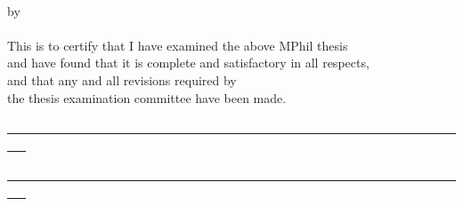 \begin{center}
{\Large \thesistitle}\\
\vspace{5mm}
by\\
\vspace{3mm}
\thesisauthor\\
\vspace{5mm}
This is to certify that I have examined the above MPhil thesis\\
and have found that it is complete and satisfactory in all respects,\\
and that any and all revisions required by\\
the thesis examination committee have been made.
\end{center}

\vspace{15mm}

\begin{center}
\underline{~~~~~~~~~~~~~~~~~~~~~~~~~~~~~~~~~~~~~~~~~~~~~~~~~~~~~~~~~~~~~~~~~~~~~~~~~~~ }\\
\supervisorinfo
\end{center}


\vspace{15mm}
\begin{center}
\underline{~~~~~~~~~~~~~~~~~~~~~~~~~~~~~~~~~~~~~~~~~~~~~~~~~~~~~~~~~~~~~~~~~~~~~~~~~~~ }\\
\depheadinfo
\end{center}

\vspace{5mm}
\begin{center}
\departmentname\\
\vspace{5mm}
\signdate
\end{center}
